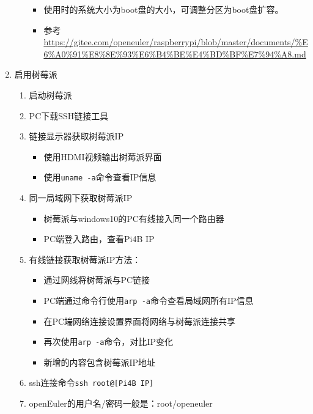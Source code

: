 \documentclass{article}
\begin{document}
\begin{enumerate}
\begin{enumerate}
\begin{itemize}
			            \item 使用时的系统大小为boot盘的大小，可调整分区为boot盘扩容。
			            \item 参考\url{https://gitee.com/openeuler/raspberrypi/blob/master/documents/%E6%A0%91%E8%8E%93%E6%B4%BE%E4%BD%BF%E7%94%A8.md}
		            \end{itemize}
	      \end{enumerate}
	\item 启用树莓派
	      \begin{enumerate}
		      \item 启动树莓派
		      \item PC下载SSH链接工具
		      \item 链接显示器获取树莓派IP
		            \begin{itemize}
			            \item 使用HDMI视频输出树莓派界面
			            \item 使用\verb|uname -a|命令查看IP信息
		            \end{itemize}
		      \item 同一局域网下获取树莓派IP
		            \begin{itemize}
			            \item 树莓派与windows10的PC有线接入同一个路由器
			            \item PC端登入路由，查看Pi4B IP
		            \end{itemize}
		      \item 有线链接获取树莓派IP方法：
		            \begin{itemize}
			            \item 通过网线将树莓派与PC链接
			            \item PC端通过命令行使用\verb|arp -a|命令查看局域网所有IP信息
			            \item 在PC端网络连接设置界面将网络与树莓派连接共享
			            \item 再次使用\verb|arp -a|命令，对比IP变化
			            \item 新增的内容包含树莓派IP地址
		            \end{itemize}
		      \item ssh连接命令\verb|ssh root@[Pi4B IP]|
		      \item openEuler的用户名/密码一般是：root/openeuler
	      \end{enumerate}
\end{enumerate}

\newpage
\end{document}
